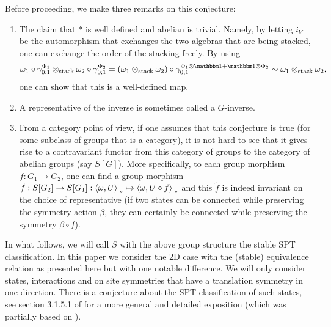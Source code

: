 \documentclass[11pt,a4paper,twoside]{article}
\numberwithin{equation}{section}
\begin{document}
Before proceeding, we make three remarks on this conjecture:
\begin{enumerate}
	\item The claim that $*$ is well defined and abelian is trivial. Namely, by letting $i_V$ be the automorphism that exchanges the two algebras that are being stacked, one can exchange the order of the stacking freely. By using
	\begin{equation}
		\omega_1\circ\gamma^{\Phi_1}_{0;1}\otimes_\text{stack}\omega_2\circ\gamma^{\Phi_2}_{0;1}=(\omega_1\otimes_{\text{stack}}\omega_2)\circ\gamma^{\Phi_1\otimes\id+\id\otimes\Phi_2}_{0;1}\sim\omega_1\otimes_{\text{stack}}\omega_2,
	\end{equation}
	one can show that this is a well-defined map.
	\item A representative of the inverse is sometimes called a $G$-inverse.
	\item From a category point of view, if one assumes that this conjecture is true (for some subclass of groups that is a category), it is not hard to see that it gives rise to a contravariant functor from this category of groups to the category of abelian groups (say $S[G]$). More specifically, to each group morphism $f:G_1\rightarrow G_2$, one can find a group morphism $\tilde{f}:S[G_2]\rightarrow S[G_1]:\expval{\omega,U}_\sim\mapsto \expval{\omega,U\circ f}_\sim$ and this $\tilde{f}$ is indeed invariant on the choice of representative (if two states can be connected while preserving the symmetry action $\beta$, they can certainly be connected while preserving the symmetry $\beta\circ f$).
\end{enumerate}
In what follows, we will call $S$ with the above group structure the stable SPT classification. In this paper we consider the 2D case with the (stable) equivalence relation as presented here but with one notable difference. We will only consider states, interactions and on site symmetries that have a translation symmetry in one direction. There is a conjecture about the SPT classification of such states, see section 3.1.5.1 of \cite{xiong2019classification} for a more general and detailed exposition (which was partially based on \cite{Chen_2013}).
\end{document}
